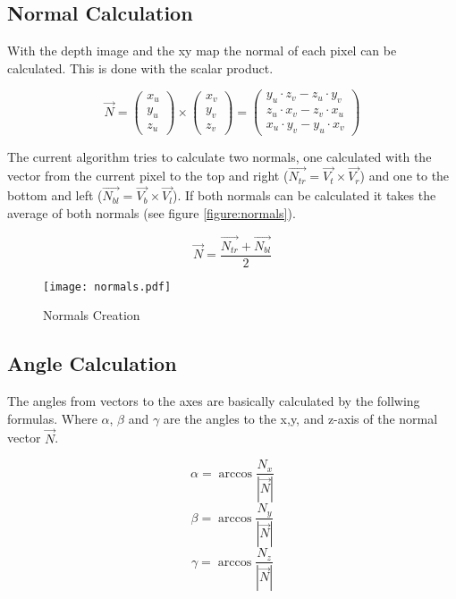 \subsection{Normal Calculation}
With the depth image and the xy map the normal of each pixel can be calculated. This is done with the scalar product.


$$ \vec{N} = \left( \begin{array}{c} x_u \\ y_u \\ z_u \end{array} \right) \times \left( \begin{array}{c} x_v \\ y_v \\ z_v \end{array} \right) 
= \left( \begin{array}{c} y_u \cdot z_v - z_u \cdot y_v \\ z_u \cdot x_v - z_v \cdot x_u \\ x_u \cdot y_v - y_u \cdot x_v \end{array}\right)
$$

The current algorithm tries to calculate two normals, one calculated with the vector from the current pixel to the top and right 
($\vec{N_{tr}}=\vec{V_t}\times\vec{V_r}$) and one to
the bottom and left ($\vec{N_{bl}}=\vec{V_b}\times\vec{V_l}$). 
If both normals can be calculated it takes the average of both normals (see figure \vref{figure:normals}).

$$ \vec{N} = \frac{\vec{N_{tr}} + \vec{N_{bl}}}{2}$$

\begin{figure}[htp]
\begin{center}
  \texttt{[image: normals.pdf]}
  \caption{Normals Creation}
  \label{figure:normals}
\end{center}
\end{figure}

\subsection{Angle Calculation}

The angles from vectors to the axes are basically calculated by the follwing formulas. Where $\alpha$, $\beta$ and $\gamma$ 
are the angles to the x,y, and z-axis of the normal vector $\vec{N}$.

$$ \alpha = \arccos \frac{N_x}{\left|\vec{N}\right|}  $$
$$ \beta  = \arccos \frac{N_y}{\left|\vec{N}\right|}  $$
$$ \gamma = \arccos \frac{N_z}{\left|\vec{N}\right|}  $$

